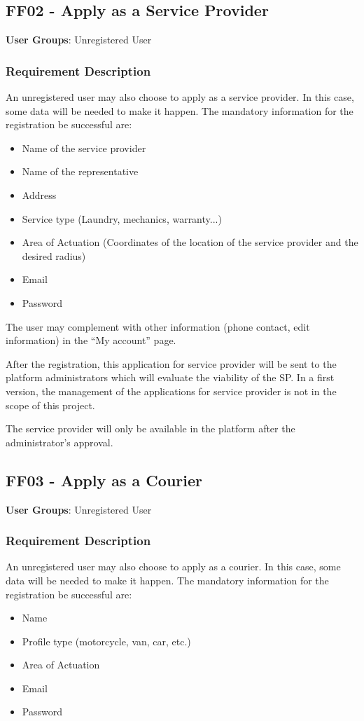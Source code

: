 \subsection{FF02 - Apply as a Service Provider}
\textbf{User Groups}: Unregistered User

\subsubsection{Requirement Description}
An unregistered user may also choose to apply as a service provider. In this case, some data will be needed to make it happen. The mandatory information for the registration be successful are: 
\begin{itemize}
    \item Name of the service provider
    \item Name of the representative
    \item Address
    \item Service type (Laundry, mechanics, warranty...)
    \item Area of Actuation (Coordinates of the location of the service provider and the desired radius)
    \item Email
    \item Password
\end{itemize}

The user may complement with other information (phone contact, edit information) in the “My account” page.
\par
After the registration, this application for service provider will be sent to the platform administrators which will evaluate the viability of the \gls{SP}. In a first version, the management of the applications for service provider is not in the scope of this project. 
\par
The service provider will only be available in the platform after the administrator’s approval.

\subsection{FF03 - Apply as a Courier}
\textbf{User Groups}: Unregistered User

\subsubsection{Requirement Description}
An unregistered user may also choose to apply as a courier. In this case, some data will be needed to make it happen. The mandatory information for the registration be successful are: 
\begin{itemize}
    \item Name
    \item Profile type (motorcycle, van, car, etc.)
    \item Area of Actuation
    \item Email
    \item Password
\end{itemize}

